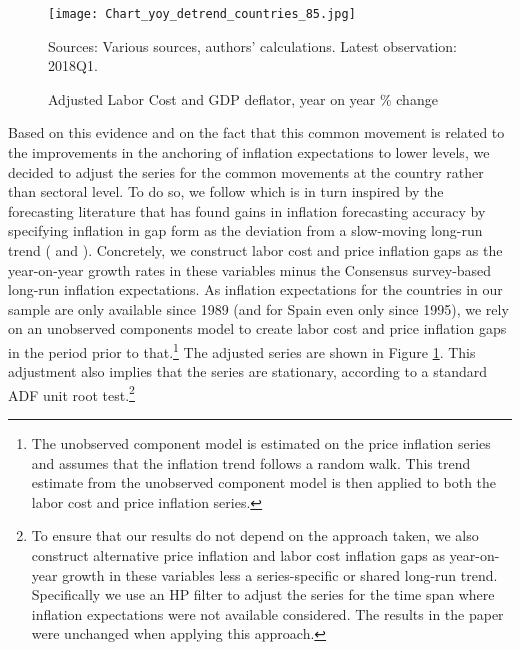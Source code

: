 \documentclass[11pt]{article}
\begin{document}
\begin{figure}[!htbp]
\begin{center}
\caption{Adjusted Labor Cost and GDP deflator, year on year \% change}\label{fig:Figure_yoycountries_detrend}
\texttt{[image: Chart\_yoy\_detrend\_countries\_85.jpg]}
\begin{minipage}{\textwidth} {\footnotesize
Sources: Various sources, authors' calculations.
Latest observation: 2018Q1.\par}
\end{minipage}
\end{center}
\end{figure}


Based on this evidence and on the fact that this common movement is related to the improvements in the anchoring of inflation expectations to lower levels, we decided to adjust the series for the common movements at the country rather than sectoral level. To do so, we follow \cite{Knotek_Zaman_2014} which is in turn inspired by the forecasting literature that has found gains in inflation forecasting accuracy by specifying inflation in gap form as the deviation from a slow-moving long-run trend (\cite{KozickiTinsley2001} and \cite{Zaman13}). Concretely, we construct labor cost and price inflation gaps as the year-on-year growth rates in these variables minus the Consensus survey-based long-run inflation expectations. As inflation expectations for the countries in our sample are only available since 1989 (and for Spain even only since 1995), we rely on an unobserved components model to create labor cost and price inflation gaps in the period prior to that.\footnote{The unobserved component model is estimated on the price inflation series and assumes that the inflation trend follows a random walk. This trend estimate from the unobserved component model is then applied to both the labor cost and price inflation series.}
 The adjusted series are shown in Figure \ref{fig:Figure_yoycountries_detrend}.
This adjustment also implies that the series are stationary, according to a standard ADF unit root test.\footnote{To ensure that our results do not depend on the approach taken, we also construct alternative price inflation and labor cost inflation gaps as year-on-year growth in these variables less a series-specific or shared long-run trend. Specifically we use an HP filter to adjust the series for the time span where inflation expectations were not available considered. The results in the paper were unchanged when applying this approach.} 
\end{document}
